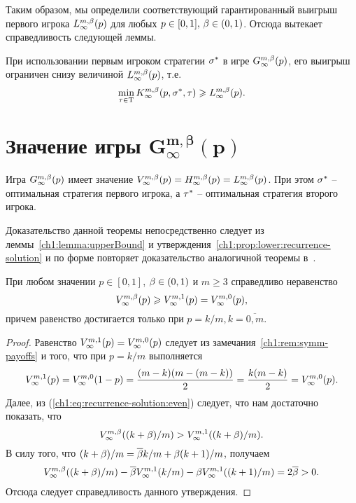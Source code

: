 {Таким образом, мы определили соответствующий гарантированный выигрыш первого игрока $\L*{\infty}(p)$ для любых $p \in [0, 1], \, \beta \in (0, 1)$.
Отсюда вытекает справедливость следующей леммы.

\begin{lemma}
  \label{ch1:lemma:first:lower}
  При использовании первым игроком стратегии $\sigma^*$ в игре $\theG*{\infty}(p)$\textup{,} его выигрыш ограничен снизу величиной $\L*{\infty}(p)$\textup{,} т.е.
  \[
    \min_{\taur \in \Tau} \K*{\infty}(p, \sigmar^*, \taur) \geq \L*{\infty}(p).
  \]
\end{lemma}

\section{Значение игры $\mathbf{G^{m,\beta}_\infty(p)}$}\label{ch1:game-value}

\begin{theorem}
  Игра $\theG*{\infty}(p)$ имеет значение $\V*{\infty}(p) = \H*{\infty}(p) = \L*{\infty}(p)$.
  При этом $\sigma^*$ -- оптимальная стратегия первого игрока\textup{,} а $\tau^*$ -- оптимальная стратегия второго игрока.
\end{theorem}
Доказательство данной теоремы непосредственно следует из леммы~\ref{ch1:lemma:upperBound} и утверждения~\ref{ch1:prop:lower:recurrence-solution} и по форме повторяет доказательство аналогичной теоремы в~\cite{domansky07}.

\begin{proposition}
  \label{ch1:prop:value-comparison}
  При любом значении $p \in [0,1]$, $\beta \in (0,1)$ и $m \geq 3$ справедливо неравенство
  \begin{equation*}
    \V*[\Co]{\infty}(p) \geq \V*[1]{\infty}(p) = \V*[0]{\infty}(p),
  \end{equation*}
  причем равенство достигается только при $p = k/m, k = \overline{0,m}$.
\end{proposition}
\begin{proof}
  Равенство $\V*[1]{\infty}(p) = \V*[0]{\infty}(p)$ следует из замечания~\ref{ch1:rem:symm-payoffs} и того, что при $p = k/m$ выполняется
  \begin{equation*}
    \V*[1]{\infty}(p) = \V*[0]{\infty}(1-p) = \frac{(m-k)(m-(m-k))}{2} = \frac{k(m-k)}{2} = \V*[0]{\infty}(p).
  \end{equation*}
  Далее, из (\ref{ch1:eq:recurrence-solution:even}) следует, что нам достаточно показать, что 
  \[
    \V*[\Co]{\infty}((k+\Co)/m) > \V*[1]{\infty}((k+\Co)/m).
  \]
  В силу того, что $(k+\beta)/m = {{\overline{\beta}}} k/m + \beta (k+1)/m$, получаем
  \begin{gather*}
    \V*[\Co]{\infty}((k+\beta)/m) - \DCo \V*[1]{\infty}(k/m) - \Co \V*[1]{\infty}((k+1)/m) = 2\DCo > 0.
  \end{gather*}
  Отсюда следует справедливость данного утверждения.
\end{proof}

}
